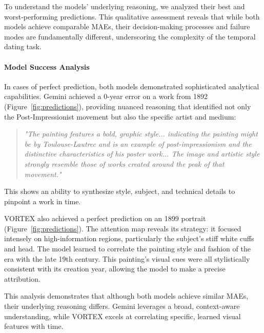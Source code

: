 \documentclass[10pt,twocolumn,letterpaper]{article}
\begin{document}
To understand the models' underlying reasoning, we analyzed their best and worst-performing predictions. This qualitative assessment reveals that while both models achieve comparable MAEs, their decision-making processes and failure modes are fundamentally different, underscoring the complexity of the temporal dating task.

\paragraph{Model Success Analysis}
In cases of perfect prediction, both models demonstrated sophisticated analytical capabilities. Gemini achieved a 0-year error on a work from 1892 (Figure~\ref{fig:predictions}), providing nuanced reasoning that identified not only the Post-Impressionist movement but also the specific artist and medium:
\begin{quote}
    \textit{"The painting features a bold, graphic style... indicating the painting might be by Toulouse-Lautrec and is an example of post-impressionism and the distinctive characteristics of his poster work... The image and artistic style strongly resemble those of works created around the peak of that movement."}
\end{quote}
This shows an ability to synthesize style, subject, and technical details to pinpoint a work in time.

VORTEX also achieved a perfect prediction on an 1899 portrait (Figure~\ref{fig:predictions}). The attention map reveals its strategy: it focused intensely on high-information regions, particularly the subject's stiff white cuffs and head. The model learned to correlate the painting style and fashion of the era with the late 19th century. This painting's visual cues were all stylistically consistent with its creation year, allowing the model to make a precise attribution.

This analysis demonstrates that although both models achieve similar MAEs, their underlying reasoning differs. Gemini leverages a broad, context-aware understanding, while VORTEX excels at correlating specific, learned visual features with time.
\end{document}
